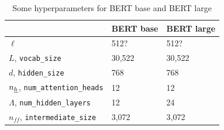 \begin{table}[!h]
\centering
\begin{tabular}{|l|l|l|}
\hline
 & \cellcolor[HTML]{FFFFC7}BERT base & \cellcolor[HTML]{FFFFC7}BERT large \\ 
 \hline
\cellcolor[HTML]{FFFFC7}$\ell$ & 512? & 512? \\ \hline
\cellcolor[HTML]{FFFFC7}$L$, {\tt vocab\_size} & 30,522 & 30,522 \\ \hline
\cellcolor[HTML]{FFFFC7}$d$, {\tt hidden\_size} & 768 & 768 \\ \hline
\cellcolor[HTML]{FFFFC7}$n_{\underline{h}}$, {\tt num\_attention\_heads} & 12 & 12 \\ \hline
\cellcolor[HTML]{FFFFC7}$\Lambda$, {\tt num\_hidden\_layers} & 12 & 24 \\ \hline
\cellcolor[HTML]{FFFFC7}$n_{ff}$, {\tt intermediate\_size} & 3,072 & 3,072 \\ \hline
\end{tabular}
\caption{Some hyperparameters for BERT base and BERT large}
\label{tab-bert}
\end{table}